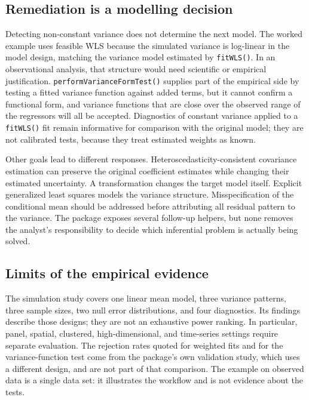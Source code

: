 \subsection{Remediation is a modelling decision}\label{remediation-is-a-modelling-decision}

Detecting non-constant variance does not determine the next model. The worked
example uses feasible WLS because the simulated variance is log-linear in the
model design, matching the variance model estimated by \texttt{fitWLS()}. In an
observational analysis, that structure would need scientific or empirical
justification. \texttt{performVarianceFormTest()} supplies part of the empirical
side by testing a fitted variance function against added terms, but it cannot
confirm a functional form, and variance functions that are close over the
observed range of the regressors will all be accepted. Diagnostics of
constant variance applied to a \texttt{fitWLS()} fit remain informative for
comparison with the original model; they are not calibrated tests, because
they treat estimated weights as known.

Other goals lead to different responses. Heteroscedasticity-consistent
covariance estimation can preserve the original coefficient estimates while
changing their estimated uncertainty. A transformation changes the target model
itself. Explicit generalized least squares models the variance structure.
Misspecification of the conditional mean should be addressed before attributing
all residual pattern to the variance. The package exposes several follow-up
helpers, but none removes the analyst's responsibility to decide which
inferential problem is actually being solved.

\subsection{Limits of the empirical evidence}\label{limits-of-the-empirical-evidence}

The simulation study covers one linear mean model, three variance patterns,
three sample sizes, two null error distributions, and four diagnostics. Its
findings describe those designs; they are not an exhaustive power ranking. In
particular, panel, spatial, clustered, high-dimensional, and time-series
settings require separate evaluation. The rejection rates quoted for weighted
fits and for the variance-function test come from the package's own validation
study, which uses a different design, and are not part of that comparison. The
example on observed data is a single data set: it illustrates the workflow and
is not evidence about the tests.

